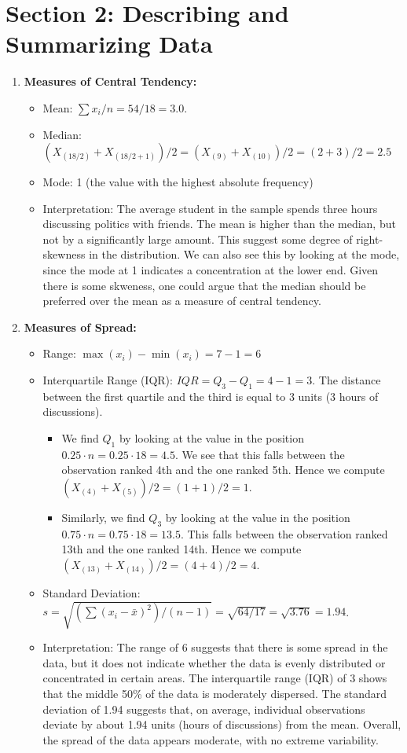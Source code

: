 \documentclass{article}
\begin{document}
\section*{Section 2: Describing and Summarizing Data}

\begin{enumerate}
\item \textbf{Measures of Central Tendency:}\begin{itemize}
\item Mean: $\sum x_i / n = 54/ 18 = 3.0$.
\item Median: $(X_{(18/2)}+X_{(18/2+1)})/2=(X_{(9)}+X_{(10)})/2=(2+3)/2=2.5$
\item Mode: 1 (the value with the highest absolute frequency)
\item Interpretation: The average student in the sample spends three hours discussing politics with friends. The mean is higher than the median, but not by a significantly large amount. This suggest some degree of right-skewness in the distribution. We can also see this by looking at the mode, since the mode at 1 indicates a concentration at the lower end. Given there is some skweness, one could argue that the median should be preferred over the mean as a measure of central tendency.
\end{itemize}
\item \textbf{Measures of Spread:}
\begin{itemize}
    \item Range: $\max(x_i)-\min(x_i)=7-1=6$
    \item Interquartile Range (IQR): $IQR=Q_3-Q_1=4-1=3$. The distance between the first quartile and the third is equal to 3 units (3 hours of discussions).
        \begin{itemize}
            \item We find $Q_1$ by looking at the value in the position $0.25\cdot n=0.25\cdot 18=4.5$. We see that this falls between the observation ranked 4th and the one ranked 5th. Hence we compute $(X_{(4)}+X_{(5)})/2=(1+1)/2=1$.
            \item Similarly, we find $Q_3$ by looking at the value in the position $0.75\cdot n=0.75\cdot 18=13.5$. This falls between the observation ranked 13th and the one ranked 14th. Hence we compute $(X_{(13)}+X_{(14)})/2=(4+4)/2=4$.
        \end{itemize}
    \item Standard Deviation: $s=\sqrt{(\sum (x_i-\bar{x})^2 )/ (n-1) }= \sqrt{64/ 17} = \sqrt{3.76} = 1.94 $.
    \item Interpretation: The range of 6 suggests that there is some spread in the data, but it does not indicate whether the data is evenly distributed or concentrated in certain areas. The interquartile range (IQR) of 3 shows that the middle 50\% of the data is moderately dispersed. The standard deviation of 1.94 suggests that, on average, individual observations deviate by about 1.94 units (hours of discussions) from the mean. Overall, the spread of the data appears moderate, with no extreme variability.


\end{itemize}
\end{enumerate}
\end{document}
